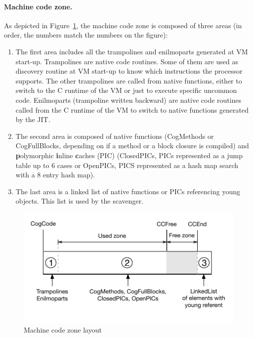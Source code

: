 \documentclass[10pt,preprint,nonatbib]{sigplanconf}
\newcommand{\figref}[1]{Figure~\ref{fig:#1}}
\begin{document}
\paragraph{Machine code zone.} As depicted in \figref{CogMemory}, the machine code zone is composed of three areas (in order, the numbers match the numbers on the figure):
\begin{enumerate}
	\item The first area includes all the trampolines and enilmoparts generated at VM start-up. Trampolines are native code routines. Some of them are used as discovery routine at VM start-up to know which instructions the processor supports. The other trampolines are called from native functions, either to switch to the C runtime of the VM or just to execute specific uncommon code. Enilmoparts (trampoline written backward) are native code routines called from the C runtime of the VM to switch to native functions generated by the JIT. 
	\item The second area is composed of native functions (CogMethods or CogFullBlocks, depending on if a method or a block closure is compiled) and \textbf{p}olymorphic \textbf{i}nline \textbf{c}aches (PIC) (ClosedPICs, PICs represented as a jump table up to 6 cases or OpenPICs, PICS represented as a hash map search with a 8 entry hash map).~\cite{Holz91a}
	\item The last area is a linked list of native functions or PICs referencing young objects. This list is used by the scavenger.
\end{enumerate}

\begin{figure}[htp!]
     \begin{center}
         \includegraphics[width=\linewidth]{CogMemory}
         \caption{Machine code zone layout}
         \label{fig:CogMemory}
     \end{center}
 \end{figure}
\end{document}
